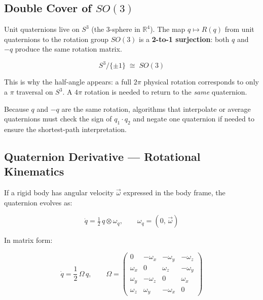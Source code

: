 \documentclass[12pt,a4paper]{article}
\begin{document}
\subsection{Double Cover of $SO(3)$}
\label{sec:double-cover}

Unit quaternions live on $S^3$ (the 3-sphere in $\mathbb{R}^4$). The map
$q \mapsto R(q)$ from unit quaternions to the rotation group $SO(3)$ is a
\textbf{2-to-1 surjection}: both $q$ and $-q$ produce the same rotation
matrix.

\begin{equation}
  S^3 \big/ \{\pm 1\} \;\cong\; SO(3)
\end{equation}

This is why the half-angle appears: a full $2\pi$ physical rotation
corresponds to only a $\pi$ traversal on $S^3$. A $4\pi$ rotation is needed
to return to the \emph{same} quaternion.

\begin{keybox}
Because $q$ and $-q$ are the same rotation, algorithms that interpolate or
average quaternions must check the sign of $q_1 \cdot q_2$ and negate one
quaternion if needed to ensure the shortest-path interpretation.
\end{keybox}

\subsection{Quaternion Derivative --- Rotational Kinematics}

If a rigid body has angular velocity $\vec{\omega}$ expressed in the body
frame, the quaternion evolves as:

\begin{equation}
  \dot{q} = \tfrac{1}{2}\,q \otimes \omega_q,
  \qquad \omega_q = (0,\,\vec{\omega})
\end{equation}

In matrix form:

\begin{equation}
  \dot{q} = \frac{1}{2}\,\Omega\,q, \qquad
  \Omega = \begin{pmatrix}
    0         & -\omega_x & -\omega_y & -\omega_z \\
    \omega_x  & 0          & \omega_z  & -\omega_y \\
    \omega_y  & -\omega_z  & 0          & \omega_x  \\
    \omega_z  & \omega_y   & -\omega_x  & 0
  \end{pmatrix}
\end{equation}
\end{document}
